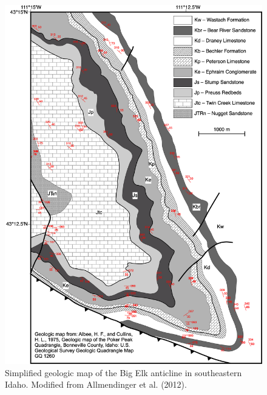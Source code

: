 \documentclass[a4paper , 12pt]{book}
\begin{document}
\begin{figure}[H]
    \centering
    \includegraphics[width=14cm]{Figures/ch5f8.png}
    \caption{Simplified geologic map of the Big Elk anticline in southeastern Idaho. Modified from Allmendinger et al. (2012).}
\end{figure}

\begin{center}
\end{center}
\end{document}
